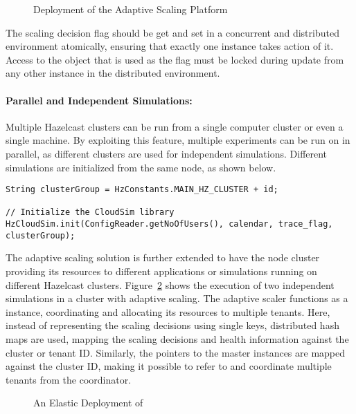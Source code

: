 \begin{figure}[!htbp]
\begin{center}
\end{center}
 \caption{Deployment of the Adaptive Scaling Platform}
 \label{fig:IAS}
\end{figure}

The scaling decision flag should be get and set in a concurrent and distributed environment atomically, ensuring that exactly one instance takes action of it. Access to the object that is used as the flag must be locked during update from any other instance in the distributed environment. 

\paragraph*{Parallel and Independent Simulations:}
Multiple Hazelcast clusters can be run from a single computer cluster or even a single machine. By exploiting this feature, multiple experiments can be run on  in parallel, as different clusters are used for independent simulations. Different simulations are initialized from the same node, as shown below.

{\fontsize{10}{10}\selectfont
\begin{lstlisting}
String clusterGroup = HzConstants.MAIN_HZ_CLUSTER + id;

// Initialize the CloudSim library
HzCloudSim.init(ConfigReader.getNoOfUsers(), calendar, trace_flag, clusterGroup);
\end{lstlisting}
}
The adaptive scaling solution is further extended to have the node cluster providing its resources to different applications or simulations running on different Hazelcast clusters. Figure~\ref{fig:XIAS} shows the execution of two independent simulations in a cluster with adaptive scaling. The adaptive scaler functions as a  instance, coordinating and allocating its resources to multiple tenants. Here, instead of representing the scaling decisions using single keys, distributed hash maps are used, mapping the scaling decisions and health information against the cluster or tenant ID. Similarly, the pointers to the master instances are mapped against the cluster ID, making it possible to refer to and coordinate multiple tenants from the coordinator.

\begin{figure}[!htbp]
\begin{center}
\end{center}
 \caption{An Elastic Deployment of }
 \label{fig:XIAS}
\end{figure}


